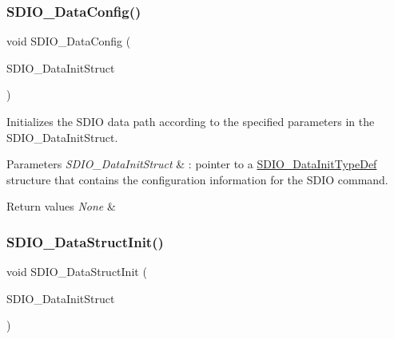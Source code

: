 \subsubsection{\texorpdfstring{SDIO\_DataConfig()}{SDIO\_DataConfig()}}
{\footnotesize\ttfamily void S\+D\+I\+O\+\_\+\+Data\+Config (\begin{DoxyParamCaption}\item[{\mbox{\hyperlink{struct_s_d_i_o___data_init_type_def}{S\+D\+I\+O\+\_\+\+Data\+Init\+Type\+Def}} $\ast$}]{S\+D\+I\+O\+\_\+\+Data\+Init\+Struct }\end{DoxyParamCaption})}



Initializes the S\+D\+IO data path according to the specified parameters in the S\+D\+I\+O\+\_\+\+Data\+Init\+Struct. 


\begin{DoxyParams}{Parameters}
{\em S\+D\+I\+O\+\_\+\+Data\+Init\+Struct} & \+: pointer to a \mbox{\hyperlink{struct_s_d_i_o___data_init_type_def}{S\+D\+I\+O\+\_\+\+Data\+Init\+Type\+Def}} structure that contains the configuration information for the S\+D\+IO command. \\
\hline
\end{DoxyParams}

\begin{DoxyRetVals}{Return values}
{\em None} & \\
\hline
\end{DoxyRetVals}
\mbox{\label{group___s_d_i_o___exported___functions_gaa83209c09e921521aca2587fb5b22ea2}} 
\subsubsection{\texorpdfstring{SDIO\_DataStructInit()}{SDIO\_DataStructInit()}}
{\footnotesize\ttfamily void S\+D\+I\+O\+\_\+\+Data\+Struct\+Init (\begin{DoxyParamCaption}\item[{\mbox{\hyperlink{struct_s_d_i_o___data_init_type_def}{S\+D\+I\+O\+\_\+\+Data\+Init\+Type\+Def}} $\ast$}]{S\+D\+I\+O\+\_\+\+Data\+Init\+Struct }\end{DoxyParamCaption})}



